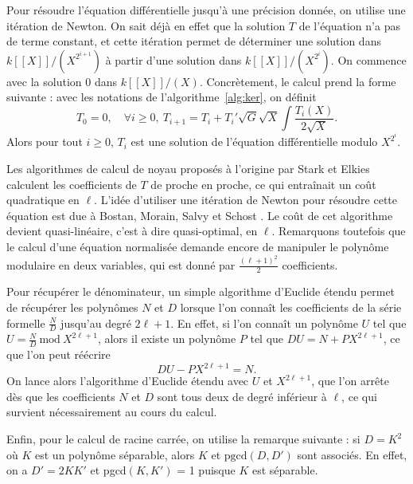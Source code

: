 \documentclass[11pt,a4paper]{article}
\renewcommand{\mod}{\ \mathrm{mod}\ }
\renewcommand{\v}{\vspace{5mm}}
\theoremstyle{definition}
\begin{document}
\v
Pour résoudre l'équation différentielle jusqu'à une précision donnée, on utilise une itération de Newton. On sait déjà en effet que la solution $T$ de l'équation n'a pas de terme constant, et cette itération permet de déterminer une solution dans $k[[X]]/(X^{2^{i+1}})$ à partir d'une solution dans $k[[X]]/(X^{2^i})$. On commence avec la solution $0$ dans $k[[X]]/(X)$. Concrètement, le calcul prend la forme suivante : avec les notations de l'algorithme~\ref{alg:ker}, on définit
$$T_0 = 0, \quad \forall i\geq 0,\ T_{i+1} = T_i + T_i' \sqrt{G} \sqrt{X} \int \frac{T_i(X)}{2\sqrt{X}}.$$
Alors pour tout $i\geq 0$, $T_i$ est une solution de l'équation différentielle modulo $X^{2^i}$.

Les algorithmes de calcul de noyau proposés à l'origine par Stark et Elkies calculent les coefficients de $T$ de proche en proche, ce qui entraînait un coût quadratique en $\ell$. L'idée d'utiliser une itération de Newton pour résoudre cette équation est due à Bostan, Morain, Salvy et Schost \cite{BMSS}. Le coût de cet algorithme devient quasi-linéaire, c'est à dire quasi-optimal, en $\ell$. Remarquons toutefois que le calcul d'une équation normalisée demande encore de manipuler le polynôme modulaire en deux variables, qui est donné par $\frac{(\ell + 1)^2}{2}$ coefficients.

\v

 Pour récupérer le dénominateur, un simple algorithme d'Euclide étendu permet de récupérer les polynômes $N$ et $D$ lorsque l'on connaît les coefficients de la série formelle $\frac{N}{D}$ jusqu'au degré $2\ell + 1$. En effet, si l'on connaît un polynôme $U$ tel que $U = \frac{N}{D} \mod X^{2\ell + 1}$, alors il existe un polynôme $P$ tel que $D U = N + P X^{2\ell+1}$, ce que l'on peut réécrire
 $$D U - P X^{2\ell + 1} = N.$$
On lance alors l'algorithme d'Euclide étendu avec $U$ et $X^{2\ell + 1}$, que l'on arrête dès que les coefficients $N$ et $D$ sont tous deux de degré inférieur à $\ell$, ce qui survient nécessairement au cours du calcul.

Enfin, pour le calcul de racine carrée, on utilise la remarque suivante : si $D = K^2$ où $K$ est un polynôme séparable, alors $K$ et $\mathrm{pgcd}(D, D')$ sont associés. En effet, on a $D' = 2 K K'$ et pgcd$(K, K')$ = 1 puisque $K$ est séparable.
\v
\end{document}
